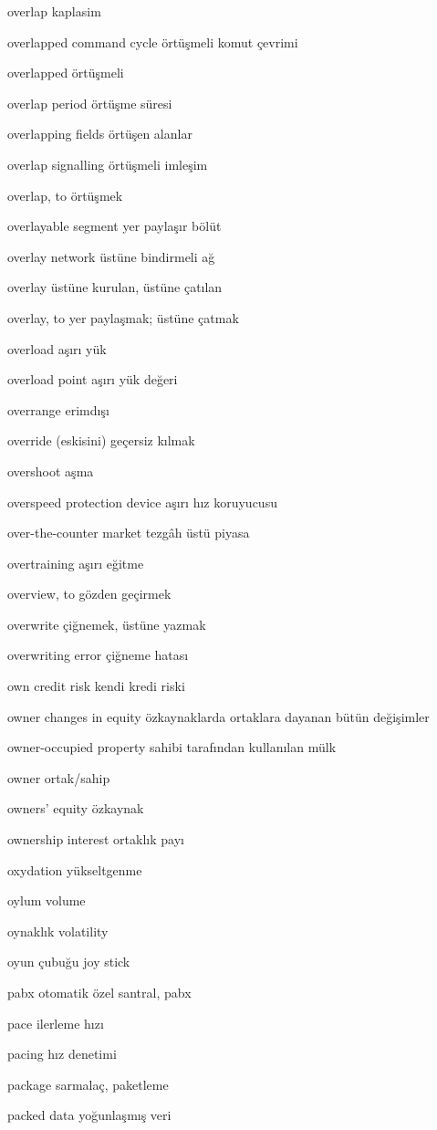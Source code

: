 \documentclass[12pt,fleqn]{article}\usepackage{../../common}
\begin{document}
overlap kaplasim

overlapped command cycle örtüşmeli komut çevrimi

overlapped örtüşmeli

overlap period örtüşme süresi

overlapping fields örtüşen alanlar

overlap signalling örtüşmeli imleşim

overlap, to örtüşmek

overlayable segment yer paylaşır bölüt

overlay network üstüne bindirmeli ağ

overlay üstüne kurulan, üstüne çatılan

overlay, to yer paylaşmak; üstüne çatmak

overload aşırı yük

overload point aşırı yük değeri

overrange erimdışı

override (eskisini) geçersiz kılmak

overshoot aşma

overspeed protection device aşırı hız koruyucusu

over-the-counter market tezgâh üstü piyasa

overtraining aşırı eğitme

overview, to gözden geçirmek

overwrite çiğnemek, üstüne yazmak

overwriting error çiğneme hatası

own credit risk kendi kredi riski

owner changes in equity özkaynaklarda ortaklara dayanan bütün değişimler

owner-occupied property sahibi tarafından kullanılan mülk

owner ortak/sahip

owners' equity özkaynak

ownership interest ortaklık payı

oxydation yükseltgenme

oylum volume

oynaklık volatility

oyun çubuğu joy stick

pabx otomatik özel santral, pabx

pace ilerleme hızı

pacing hız denetimi

package sarmalaç, paketleme

packed data yoğunlaşmış veri
\end{document}
